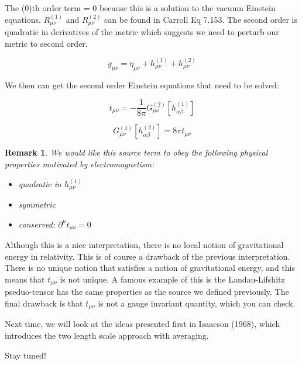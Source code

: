 \documentclass{article}
\newtheorem*{remark}{Remark}
\theoremstyle{definition}
\theoremstyle{remark}
\begin{document}
The (0)th order term  = 0 because this is a solution to the vacuum Einstein equations. $R_{\mu \nu}^{(1)}$ and $R_{\mu \nu}^{(2)}$ can be found in Carroll Eq 7.153. The second order is quadratic in derivatives of the metric which suggests we need to perturb our metric to second order.

$$
g_{\mu \nu} = \eta_{\mu \nu} + h_{\mu \nu}^{(1)} + h_{\mu \nu}^{(2)}
$$

We then can get the second order Einstein equations that need to be solved:

$$
t_{\mu \nu} = - \frac{1}{8 \pi}  G_{\mu \nu}^{(2)}[h_{\alpha \beta}^{(1)}]
$$

$$
G_{\mu \nu}^{(1)}[h_{\alpha \beta}^{(2)}] = 8 \pi t_{\mu \nu}
$$

\begin{remark}
We would like this source term to obey the following physical properties motivated by electromagnetism:
\begin{itemize}
    \item quadratic in $h_{\mu \nu}^{(1)}$
    \item symmetric
    \item conserved: $\partial^\mu t_{\mu \nu} = 0$
\end{itemize}

\end{remark}

Although this is a nice interpretation, there is no local notion of gravitational energy in relativity. This is of course a drawback of the previous interpretation. There is no unique notion that satisfies a notion of gravitational energy, and this means that $t_{\mu \nu}$ is not unique. A famous example of this is the Landau-Lifshitz pseduo-tensor has the same properties as the source we defined previously. The final drawback is that $t_{\mu \nu}$ is not a gauge invariant quantity, which you can check.

Next time, we will look at the ideas presented first in Isaacson (1968), which introduces the two length scale approach with averaging.

Stay tuned!
\end{document}
